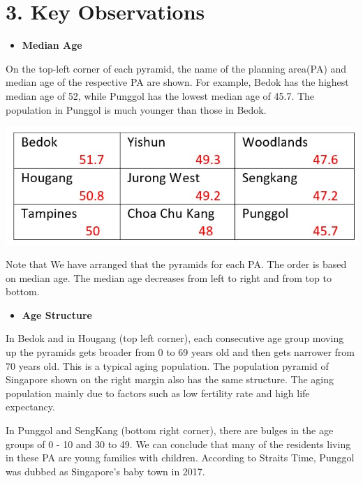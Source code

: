 \documentclass[
  letterpaper,
  DIV=11,
  numbers=noendperiod,
  oneside]{scrartcl}
\providecommand{\tightlist}{%
  \setlength{\itemsep}{0pt}\setlength{\parskip}{0pt}}\usepackage{longtable,booktabs,array}
\begin{document}
\hypertarget{key-observations}{%
\section{3. Key Observations}\label{key-observations}}

\begin{itemize}
\tightlist
\item
  \textbf{Median Age}
\end{itemize}

On the top-left corner of each pyramid, the name of the planning
area(PA) and median age of the respective PA are shown. For example,
Bedok has the highest median age of 52, while Punggol has the lowest
median age of 45.7. The population in Punggol is much younger than those
in Bedok.

\begin{marginfigure}

{\centering \includegraphics[width=7.21875in,height=\textheight]{images/median age.jpg}

}

\end{marginfigure}

Note that We have arranged that the pyramids for each PA. The order is
based on median age. The median age decreases from left to right and
from top to bottom.

\begin{itemize}
\tightlist
\item
  \textbf{Age Structure}
\end{itemize}

In Bedok and in Hougang (top left corner), each consecutive age group
moving up the pyramids gets broader from 0 to 69 years old and then gets
narrower from 70 years old. This is a typical aging population. The
population pyramid of Singapore shown on the right margin also has the
same structure. The aging population mainly due to factors such as low
fertility rate and high life expectancy.

In Punggol and SengKang (bottom right corner), there are bulges in the
age groups of 0 - 10 and 30 to 49. We can conclude that many of the
residents living in these PA are young families with children. According
to Straits Time, Punggol was dubbed as Singapore's baby town in 2017.
\end{document}
